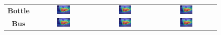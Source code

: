 \begin{figure}[ht]
\begin{tabular}{c c c c}
    \textbf{Bottle}    & \includegraphics[width=0.23\textwidth]{figures/qualitative_analysis/test_cam/2010_005860_6.jpg} & \includegraphics[width=0.23\textwidth]{figures/qualitative_analysis/test_cam/2010_005860_6.jpg} & \includegraphics[width=0.23\textwidth]{figures/qualitative_analysis/test_cam/2010_005860_6.jpg} \\
    \textbf{Bus}       & \includegraphics[width=0.23\textwidth]{figures/qualitative_analysis/test_cam/2010_005860_6.jpg} & \includegraphics[width=0.23\textwidth]{figures/qualitative_analysis/test_cam/2010_005860_6.jpg} & \includegraphics[width=0.23\textwidth]{figures/qualitative_analysis/test_cam/2010_005860_6.jpg} \\

\end{tabular}
\end{figure}

